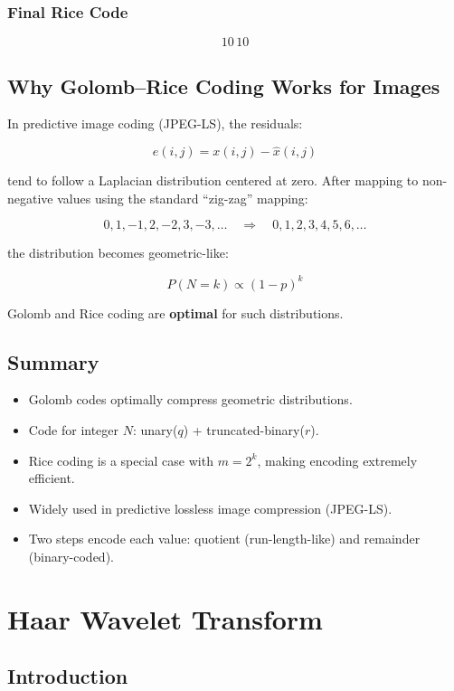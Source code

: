 \documentclass{AnantDocumentation}
\begin{document}
\subsubsection*{Final Rice Code}

\[
\boxed{10\,10}
\]

\subsection{Why Golomb--Rice Coding Works for Images}

In predictive image coding (JPEG-LS), the residuals:

\[
e(i,j) = x(i,j) - \hat{x}(i,j)
\]

tend to follow a Laplacian distribution centered at zero.  
After mapping to non-negative values using the standard “zig-zag” mapping:

\[
0,1,-1,2,-2,3,-3,\ldots \quad \Rightarrow \quad 0,1,2,3,4,5,6,\ldots
\]

the distribution becomes geometric-like:

\[
P(N = k) \propto (1-p)^k
\]

Golomb and Rice coding are \textbf{optimal} for such distributions.

\subsection{Summary}

\begin{itemize}
\item Golomb codes optimally compress geometric distributions.
\item Code for integer \(N\): unary(\(q\)) + truncated-binary(\(r\)).
\item Rice coding is a special case with \(m=2^k\), making encoding extremely efficient.
\item Widely used in predictive lossless image compression (JPEG-LS).
\item Two steps encode each value: quotient (run-length-like) and remainder (binary-coded).
\end{itemize}

\section{Haar Wavelet Transform}

\subsection{Introduction}
\end{document}
